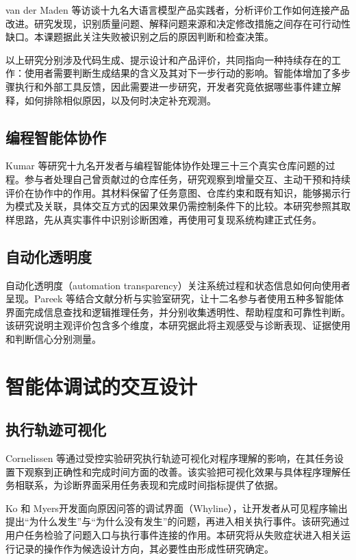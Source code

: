 van der Maden 等\cite{ref01}访谈十九名大语言模型产品实践者，分析评价工作如何连接产品改进。研究发现，识别质量问题、解释问题来源和决定修改措施之间存在可行动性缺口。本课题据此关注失败被识别之后的原因判断和检查决策。

以上研究分别涉及代码生成、提示设计和产品评价，共同指向一种持续存在的工作：使用者需要判断生成结果的含义及其对下一步行动的影响。智能体增加了多步骤执行和外部工具反馈，因此需要进一步研究，开发者究竟依据哪些事件建立解释，如何排除相似原因，以及何时决定补充观测。

\subsection{编程智能体协作}

Kumar 等\cite{ref59}研究十九名开发者与编程智能体协作处理三十三个真实仓库问题的过程。参与者处理自己曾贡献过的仓库任务，研究观察到增量交互、主动干预和持续评价在协作中的作用。其材料保留了任务意图、仓库约束和既有知识，能够揭示行为模式及关联，具体交互方式的因果效果仍需控制条件下的比较。本研究参照其取样思路，先从真实事件中识别诊断困难，再使用可复现系统构建正式任务。

\subsection{自动化透明度}

自动化透明度（automation transparency）关注系统过程和状态信息如何向使用者呈现。Pareek 等\cite{ref58}结合文献分析与实验室研究，让十二名参与者使用五种多智能体界面完成信息查找和逻辑推理任务，并分别收集透明性、帮助程度和可靠性判断。该研究说明主观评价包含多个维度，本研究据此将主观感受与诊断表现、证据使用和判断信心分别测量。

\section{智能体调试的交互设计}

\subsection{执行轨迹可视化}

Cornelissen 等\cite{ref33}通过受控实验研究执行轨迹可视化对程序理解的影响，在其任务设置下观察到正确性和完成时间方面的改善。该实验把可视化效果与具体程序理解任务相联系，为诊断界面采用任务表现和完成时间指标提供了依据。

Ko 和 Myers\cite{ref07}开发面向原因问答的调试界面（Whyline），让开发者从可见程序输出提出“为什么发生”与“为什么没有发生”的问题，再进入相关执行事件。该研究通过用户任务检验了问题入口与执行事件连接的作用。本研究将从失败症状进入相关运行记录的操作作为候选设计方向，其必要性由形成性研究确定。

